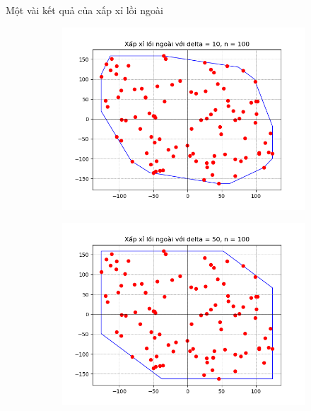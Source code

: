 \documentclass[11pt]{beamer}
\theoremstyle{definition}
\theoremstyle{plain}
\theoremstyle{plain}
\theoremstyle{remark}
\begin{document}
\begin{frame}{Một vài kết quả của xấp xỉ lồi ngoài}
\begin{figure}[htbp]
\begin{subfigure}[b]{0.4\textwidth}
			\label{fig:outerdelta2}
		\end{subfigure}
		
		\begin{subfigure}[b]{0.4\textwidth}
			\includegraphics[width=\textwidth]{outer_delta10}
		
			\label{fig:outerdelta10}
		\end{subfigure}
		\hfill
		\begin{subfigure}[b]{0.4\textwidth}
			\includegraphics[width=\textwidth]{outer_delta50}
	
			\label{fig:outerdelta50}
		\end{subfigure}
	\end{figure}
\end{frame}
\end{document}
